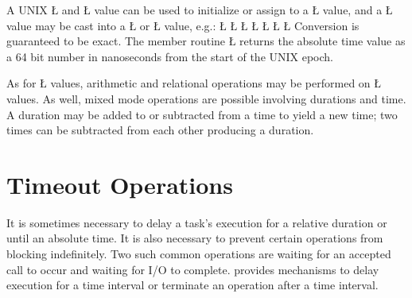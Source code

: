\documentclass[openright,twoside]{report}
\begin{document}
A UNIX \LGinlinetrue\LGbegin\lgrinde\L{}\endlgrinde\LGend{} and \LGinlinetrue\LGbegin\lgrinde\L{}\endlgrinde\LGend{} value can be used to initialize or assign to a \LGinlinetrue\LGbegin\lgrinde\L{}\endlgrinde\LGend{} value, and a \LGinlinetrue\LGbegin\lgrinde\L{}\endlgrinde\LGend{} value may be cast into a \LGinlinetrue\LGbegin\lgrinde\L{}\endlgrinde\LGend{} or \LGinlinetrue\LGbegin\lgrinde\L{}\endlgrinde\LGend{} value, e.g.:
\LGinlinefalse\LGbegin\lgrinde
\L{}
\L{}
\CE{}\L{}
\CE{}\L{}
\CE{}\L{}
\CE{}\L{}
\CE{}\L{}
\CE{}\endlgrinde\LGend
Conversion is guaranteed to be exact.
The member routine \LGinlinetrue\LGbegin\lgrinde\L{}\endlgrinde\LGend{} returns the absolute time value as a 64 bit number in nanoseconds from the start of the UNIX epoch.

As for \LGinlinetrue\LGbegin\lgrinde\L{}\endlgrinde\LGend{} values, arithmetic and relational operations may be performed on \LGinlinetrue\LGbegin\lgrinde\L{}\endlgrinde\LGend{} values.
As well, mixed mode operations are possible involving durations and time.
A duration may be added to or subtracted from a time to yield a new time;
two times can be subtracted from each other producing a duration.


\section{Timeout Operations}

It is sometimes necessary to delay a task's execution for a relative duration or until an absolute time.
It is also necessary to prevent certain operations from blocking indefinitely.
Two such common operations are waiting for an accepted call to occur and waiting for I/O to complete.
\uC provides mechanisms to delay execution for a time interval or terminate an operation after a time interval.
\end{document}
